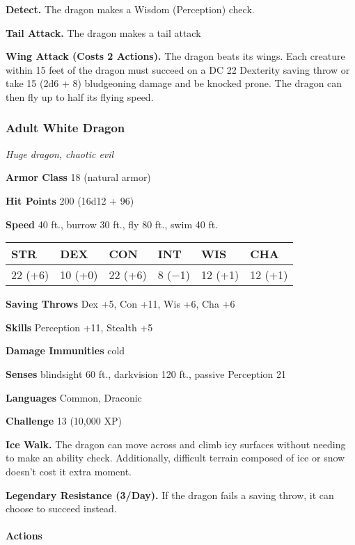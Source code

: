 \documentclass[
]{article}
\begin{document}
\textbf{Detect.} The dragon makes a Wisdom (Perception) check.

\textbf{Tail Attack.} The dragon makes a tail attack

\textbf{Wing Attack (Costs 2 Actions).} The dragon beats its wings. Each
creature within 15 feet of the dragon must succeed on a DC 22 Dexterity
saving throw or take 15 (2d6 + 8) bludgeoning damage and be knocked
prone. The dragon can then fly up to half its flying speed.

\hypertarget{adult-white-dragon}{%
\subsubsection{Adult White Dragon}\label{adult-white-dragon}}

\emph{Huge dragon, chaotic evil}

\textbf{Armor Class} 18 (natural armor)

\textbf{Hit Points} 200 (16d12 + 96)

\textbf{Speed} 40 ft., burrow 30 ft., fly 80 ft., swim 40 ft.

\begin{longtable}[]{@{}llllll@{}}
\toprule
STR & DEX & CON & INT & WIS & CHA\tabularnewline
\midrule
\endhead
22 (+6) & 10 (+0) & 22 (+6) & 8 (−1) & 12 (+1) & 12 (+1)\tabularnewline
\bottomrule
\end{longtable}

\textbf{Saving Throws} Dex +5, Con +11, Wis +6, Cha +6

\textbf{Skills} Perception +11, Stealth +5

\textbf{Damage Immunities} cold

\textbf{Senses} blindsight 60 ft., darkvision 120 ft., passive
Perception 21

\textbf{Languages} Common, Draconic

\textbf{Challenge} 13 (10,000 XP)

\textbf{Ice Walk.} The dragon can move across and climb icy surfaces
without needing to make an ability check. Additionally, difficult
terrain composed of ice or snow doesn't cost it extra moment.

\textbf{Legendary Resistance (3/Day).} If the dragon fails a saving
throw, it can choose to succeed instead.

\hypertarget{actions-40}{%
\paragraph{Actions}\label{actions-40}}
\end{document}
